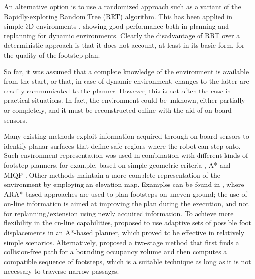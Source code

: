 An alternative option is to use a randomized approach such as a variant of the Rapidly-exploring Random Tree (RRT) algorithm. 
This has been applied in simple 3D environments \cite{Liu2012IROS}, showing good performance both in planning and replanning for dynamic environments. Clearly the disadvantage of RRT over a deterministic approach is that it does not account, at least in its basic form, for the quality of the footstep plan.

So far, it was assumed that a complete knowledge of the environment is available from the start, or that, in case of dynamic environment, changes to the latter are readily communicated to the planner. However, this is not often the case in practical situations. In fact, the environment could be unknown, either partially or completely, and it must be reconstructed online with the aid of on-board sensors.

Many existing methods exploit information acquired through on-board sensors to identify planar surfaces that define safe regions where the robot can step onto.
Such environment representation was used in combination with different kinds of footstep planners, for example, based on simple geometric criteria \cite{Okada2005ICRA}, A* \cite{Chestnutt2009IROS} and MIQP \cite{Fallon2015Humanoids}.   
Other methods maintain a more complete representation of the environment by employing an elevation map.
Examples can be found in \cite{Maier2013IROS, Stumpf2014Humanoids}, where ARA*-based approaches are used to plan footsteps on uneven ground; the use of on-line information is aimed at improving the plan during the execution, and not for replanning/extension using newly acquired information.
To achieve more flexibility in the on-line capabilities, \cite{Karkowski2016Humanoids} proposed to use adaptive sets of possible foot displacements in an A*-based planner, which proved to be effective in relatively simple scenarios. Alternatively, \cite{Yamamoto2021AdvancedRobotics} proposed a two-stage method that first finds a collision-free path for a bounding occupancy volume and then computes a compatible sequence of footsteps, which is a suitable technique as long as it is not necessary to traverse narrow passages.


